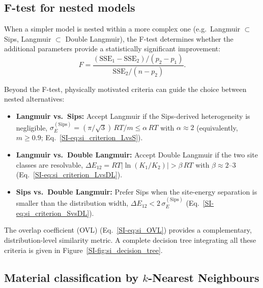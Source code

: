 \documentclass[journal=jacsat,manuscript=article]{achemso}
\begin{document}
	\subsection{F-test for nested models}
	\label{sec:Ftest}

	When a simpler model is nested within a more complex one (e.g.\ Langmuir $\subset$ Sips, Langmuir $\subset$ Double Langmuir), the F-test determines whether the additional parameters provide a statistically significant improvement:
	\begin{equation}
		F = \frac{(\mathrm{SSE}_1 - \mathrm{SSE}_2)/(p_2 - p_1)}
		{\mathrm{SSE}_2 / (n - p_2)}.
		\label{eq:Ftest}
	\end{equation}

	Beyond the F-test, physically motivated criteria can guide the choice between nested alternatives:
	\begin{itemize}
		\item \textbf{Langmuir vs.\ Sips:} Accept Langmuir if the Sips-derived heterogeneity is negligible, $\sigma_E^{\mathrm{(Sips)}} = (\pi/\sqrt{3})\,RT/m \leq \alpha\,RT$ with $\alpha \approx 2$ (equivalently, $m \geq 0.9$; Eq.~\ref{SI-eq:si_criterion_LvsS}).
		\item \textbf{Langmuir vs.\ Double Langmuir:} Accept Double Langmuir if the two site classes are resolvable, $\Delta E_{12} = RT|\ln(K_1/K_2)| > \beta\,RT$ with $\beta \approx 2$--$3$ (Eq.~\ref{SI-eq:si_criterion_LvsDL}).
		\item \textbf{Sips vs.\ Double Langmuir:} Prefer Sips when the site-energy separation is smaller than the distribution width, $\Delta E_{12} < 2\,\sigma_E^{\mathrm{(Sips)}}$ (Eq.~\ref{SI-eq:si_criterion_SvsDL}).
	\end{itemize}
	The overlap coefficient (OVL) (Eq.~\ref{SI-eq:si_OVL}) provides a complementary, distribution-level similarity metric. A complete decision tree integrating all these criteria is given in Figure~\ref{SI-fig:si_decision_tree}.

	\subsection{Material classification by $k$-Nearest Neighbours}
	\label{sec:KNN}
\end{document}
